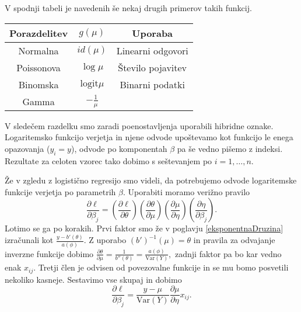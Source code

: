 \documentclass[12pt,a4paper]{amsart}
\theoremstyle{definition} %
\theoremstyle{plain} %
\begin{document}
V spodnji tabeli je navedenih še nekaj drugih primerov takih funkcij.

\begin{center}
    \begin{tabular}{ | c | c | c |}
        \hline
        Porazdelitev & $g(\mu)$ & Uporaba \\
        \hline
        Normalna & $id(\mu)$ &  Linearni odgovori\\
        Poissonova & $\log \mu$ & Število pojavitev \\
        Binomska & $\mathrm{logit}\mu$ & Binarni podatki\\
        Gamma & $-\frac{1}{\mu}$ & \\
        \hline
    \end{tabular}
\end{center}

%
V sledečem razdelku smo zaradi poenostavljenja uporabili hibridne oznake. Logaritemsko funkcijo verjetja in njene odvode upoštevamo kot funkcijo le
enega opazovanja ($y_{i} = y$), odvode po komponentah $\beta$ pa še vedno pišemo z indeksi. Rezultate za celoten vzorec tako dobimo s seštevanjem po $i = 1,\ldots,n.$

Že v zgledu z logistično regresijo smo videli, da potrebujemo odvode logaritemske funkcije verjetja po parametrih $\beta.$ Uporabiti moramo verižno pravilo 
\[
    \frac{\partial \ell}{\partial\beta_{j}} = \left(\frac{\partial \ell}{\partial \theta}\right)\left(\frac{\partial \theta}{\partial\mu}\right)
    \left(\frac{\partial\mu}{\partial\eta}\right)\left(\frac{\partial\eta}{\partial\beta_{j}}\right).
\]
Lotimo se ga po korakih. Prvi faktor smo že v poglavju \ref{eksponentnaDruzina} izračunali kot $\frac{y-b'(\theta)}{a(\phi)}.$ Z uporabo $(b')^{-1}(\mu) = \theta$ in pravila za odvajanje inverzne funkcije 
dobimo $\frac{\partial \theta}{\partial\mu} = \frac{1}{b''(\theta)} = \frac{a(\phi)}{\mathrm{Var}(Y)},$ zadnji faktor pa bo kar vedno enak $x_{ij}.$ Tretji člen je odvisen
od povezovalne funkcije in se mu bomo posvetili nekoliko kasneje. Sestavimo vse skupaj in dobimo
\[
    \frac{\partial \ell}{\partial\beta_{j}} = \frac{y-\mu}{\mathrm{Var}(Y)}\frac{\partial \mu}{\partial\eta}x_{ij}.
\]
\end{document}
